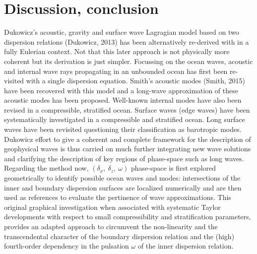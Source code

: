 \documentclass[a4paper,11pt]{article}
\begin{document}
\section{Discussion, conclusion}
\label{SectionDiscussion}
Dukowicz's acoustic, gravity and surface wave Lagragian model based on two dispersion relations (Dukowicz, 2013) has been alternatively re-derived with in a fully Eulerian context. Not that this later approach is not physically more coherent but its derivation is just simpler. Focussing on the ocean waves, acoustic and internal wave rays propagating in an unbounded ocean has first been re-visited with a single dispersion equation. Smith's acoustic modes (Smith, 2015) have been recovered with this model and a long-wave approximation of these acoustic modes has been proposed. Well-known internal modes have also been revised in a compressible, stratified ocean. Surface waves (edge waves) have been systematically investigated in a compressible and stratified ocean. Long surface waves have been revisited questioning their classification as barotropic modes. Dukowicz effort to give a coherent and complete framework for the description of geophysical waves is thus carried on much further integrating new wave solutions and clarifying the description of key regions of phase-space such as long waves.\\  
Regarding the method now, $(\delta_x,\ \delta_z,\ \omega)$ phase-space is first explored geometrically to identify possible ocean waves and modes: intersections of the inner and boundary dispersion surfaces are localized numerically and are then used as references to evaluate the pertinence of wave approximations. This original graphical investigation when associated with systematic Taylor developments with respect to small compressibility and stratification parameters, provides an adapted approach to circumvent the non-linearity and the transcendental character of the boundary dispersion relation and the (high) fourth-order dependency in the pulsation $\omega$ of the inner dispersion relation.\\
\end{document}
